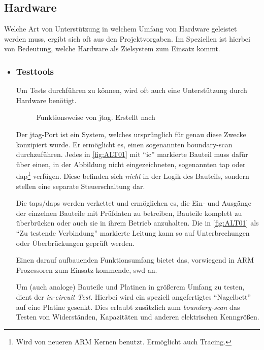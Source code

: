 \subsection{Hardware}\label{sub:hardware}
Welche Art von Unterstützung in welchem Umfang von Hardware geleistet werden
muss, ergibt sich oft aus den Projektvorgaben. Im Speziellen ist hierbei von
Bedeutung, welche Hardware als Zielsystem zum Einsatz kommt.
\begin{itemize}
  \item \subsubsection*{Testtools} Um Tests durchführen zu können, wird
  oft auch eine Unterstützung durch Hardware benötigt. 
  \begin{figure}[!h]
    \centering
    \def\svgwidth{\columnwidth}
    
    \caption{Funktionsweise von \gls{jtag}. Erstellt nach \cite{ALT01}}
    \label{fig:ALT01}
  \end{figure}
  Der \gls{jtag}-Port ist ein System, welches ursprünglich für genau diese
  Zwecke konzipiert wurde. Er ermöglicht es, einen sogenannten boundary-scan
  durchzuführen. Jedes in \autoref{fig:ALT01} mit "`\gls{ic}"' markierte
  Bauteil muss dafür über einen, in der Abbildung nicht eingezeichneten, sogenannten \gls{tap} oder
  \gls{dap}\footnote{Wird von neueren ARM Kernen benutzt.
  Ermöglicht auch Tracing.} verfügen. Diese befinden sich \emph{nicht} in der
  Logik des Bauteils, sondern stellen eine separate Steuerschaltung dar.
  
  Die \glspl{tap}/\glspl{dap} werden verkettet und ermöglichen es, die Ein-
  und Ausgänge der einzelnen Bauteile mit Prüfdaten zu betreiben, Bauteile komplett
  zu überbrücken oder auch sie in ihrem Betrieb anzuhalten.
  Die in \autoref{fig:ALT01} als "`Zu testende Verbindung"' markierte Leitung
  kann so auf Unterbrechungen oder Überbrückungen geprüft werden.
  
  Einen darauf aufbauenden Funktionsumfang bietet das, vorwiegend in ARM
  Prozessoren zum Einsatz kommende, \gls{swd} an.
  
  Um (auch analoge) Bauteile und Platinen in größerem Umfang zu testen, dient
  der \emph{in-circuit Test}. Hierbei wird ein speziell angefertigtes
  "`Nagelbett"' auf eine Platine gesenkt. Dies erlaubt zusätzlich zum
  \emph{boundary-scan} das Testen von Widerständen, Kapazitäten und anderen
  elektrischen Kenngrößen.
   

\end{itemize}
